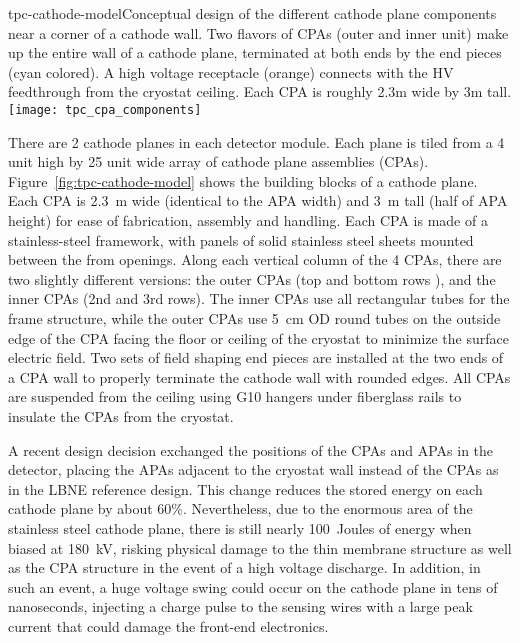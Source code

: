 \begin{cdrfigure}{tpc-cathode-model}{Conceptual design of the different cathode plane components near a corner of a cathode wall.  Two flavors of CPAs (outer and inner unit) make up the entire wall of a cathode plane, terminated at both ends by the end pieces (cyan colored).  A high voltage receptacle (orange) connects with the HV feedthrough from the cryostat ceiling. Each CPA is roughly 2.3m wide by 3m tall.}
\texttt{[image: tpc\_cpa\_components]}
\end{cdrfigure}

There are 2 cathode planes in each detector module.  Each plane is tiled from a 4 unit high by 25 unit wide array of cathode plane assemblies (CPAs). Figure~\ref{fig:tpc-cathode-model} shows the building blocks of a cathode plane.  Each CPA is 2.3~m wide (identical to the APA width) and 3~m tall (half of APA height) for ease of fabrication, assembly and handling.  Each CPA is made of a stainless-steel framework, with panels of solid stainless steel sheets mounted between the from openings.  Along each vertical  column of the 4 CPAs, there are two slightly different versions: the outer CPAs (top and bottom rows ), and the inner CPAs (2nd and 3rd rows).  The inner CPAs use all rectangular tubes for the frame structure, while the outer CPAs use 5~cm OD round tubes on the outside edge of the CPA facing the floor or ceiling of the cryostat to minimize the surface electric field.  Two sets of field shaping end pieces are installed at the two ends of a CPA wall to properly terminate the cathode wall with rounded edges.  All CPAs are suspended from the ceiling using G10 hangers under fiberglass rails to insulate the CPAs from the cryostat.

A recent design decision exchanged the positions of the CPAs and APAs in the detector, placing the APAs adjacent to the cryostat wall instead of the CPAs as in the LBNE reference design.  This change reduces the stored energy on each cathode plane by about 60\%.  Nevertheless, due to the enormous area of the stainless steel cathode plane, there is still nearly 100~Joules of energy when biased at 180~kV, risking physical damage to the thin membrane structure as well as the CPA structure in the event of a high voltage discharge.  In addition, in such an event, a huge voltage swing could occur on the cathode plane in tens of nanoseconds, injecting a  charge pulse to the sensing wires with a large peak current that could damage the front-end electronics.

